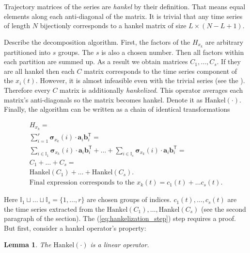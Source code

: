 \documentclass[referee, pdflatex, sn-mathphys-num]{sn-jnl}
\theoremstyle{definition}
\theoremstyle{plain}
\newtheorem{Lem}{Lemma}
\begin{document}
	Trajectory matrices of the series are \emph{hankel} by their definition. That means equal elements along each anti-diagonal of the matrix. It is trivial that any time series of length $ N $ bijectionly corresponds to a hankel matrix of size $ L \times (N - L + 1) $.
	
	Describe the decomposition algorithm. First, the factors of the $ H_{x_k} $ are arbitrary partitioned into $ s $ groups. The $ s $ is also a chosen number. Then all factors within each partition are summed up. As a result we obtain matrices $ C_1, \ldots, C_s $. If they are all hankel then each $ C $ matrix corresponds to the time series component of the $ x_i(t) $. However, it is almost infeasible even with the trivial series (see the \cite{ecfb9dc578be43ae9ee8fc88b8ff9151}). Therefore every $ C $ matrix is additionally \emph{hankelized}. This operator averages each matrix's anti-diagonals so the matrix becomes hankel. Denote it as $ \text{Hankel}(\cdot) $. Finally, the algorithm can be written as a chain of identical transformations
	
	\begin{gather}
		H_{x_k} = \\
		\sum\limits_{i = 1}^{r} \boldsymbol{\sigma}_{x_k}(i) \cdot \mathbf{a}_i  \mathbf{b}_i^{\mathsf{T}} = \label{eq:decomp_alg_first_step} \\
		\sum\limits_{i \in \mathbb{I}_1} \boldsymbol{\sigma}_{x_k}(i) \cdot \mathbf{a}_i  \mathbf{b}_i^{\mathsf{T}} + \ldots + \sum\limits_{i \in \mathbb{I}_s} \boldsymbol{\sigma}_{x_k}(i) \cdot \mathbf{a}_i  \mathbf{b}_i^{\mathsf{T}} = \\
		C_1 + \ldots + C_s = \label{eq:hankelization_step} \\
	    \text{Hankel}(C_1) + \ldots + \text{Hankel}(C_s). \nonumber \\
	    \text{Final expression corresponds to the } x_k(t) = c_1(t) + \ldots c_s(t). \nonumber
	\end{gather}
    
	Here $ \mathbb{I}_1 \sqcup \ldots \sqcup \mathbb{I}_s = \{1, \ldots, r\} $ are chosen groups of indices. $ c_1(t), \ldots , c_s(t) $ are the time series extracted from the $ \text{Hankel}(C_1), \ldots , \text{Hankel}(C_s) $ (see the second paragraph of the section). The (\ref{eq:hankelization_step}) step requires a proof. But first, consider a hankel operator's property:
	
	\begin{Lem}
		The $ \text{Hankel}(\cdot) $ is a linear operator.
	\end{Lem}
	
\end{document}
